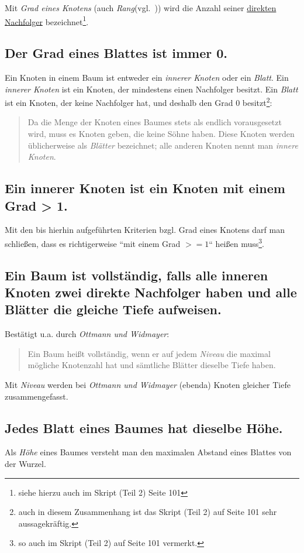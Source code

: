 Mit \textit{Grad eines Knotens} (auch \textit{Rang}(vgl.~\cite[260]{OW17e})) wird die Anzahl seiner \underline{direkten Nachfolger} bezeichnet\footnote{siehe hierzu auch im Skript (Teil 2) Seite 101}.

\subsection*{Der Grad eines Blattes ist immer 0.}

Ein Knoten in einem Baum ist entweder ein \textit{innerer Knoten} oder ein \textit{Blatt}.
Ein \textit{innerer Knoten} ist ein Knoten, der mindestens einen Nachfolger besitzt.
Ein \textit{Blatt} ist ein Knoten, der keine Nachfolger hat, und deshalb den Grad $0$ besitzt\footnote{
auch in diesem Zusammenhang ist das Skript (Teil 2) auf Seite 101 sehr aussagekräftig.
}:

\blockquote[{\cite[259, Hervorhebungen i.O.]{OW17e}}]{
    Da die Menge der Knoten eines Baumes stets als endlich vorausgesetzt wird, muss es
    Knoten geben, die keine Söhne haben. Diese Knoten werden üblicherweise als \textit{Blätter}
    bezeichnet; alle anderen Knoten nennt man \textit{innere Knoten}.
}

\subsection*{Ein innerer Knoten ist ein Knoten mit einem Grad > 1.}
Mit den bis hierhin aufgeführten Kriterien {bzgl.} Grad eines Knotens darf man schließen, dass es richtigerweise ``mit einem Grad $>= 1$`` heißen muss\footnote{
    so auch im Skript (Teil 2) auf Seite 101 vermerkt.
}.


\subsection*{Ein Baum ist vollständig, falls alle inneren Knoten zwei direkte Nachfolger haben und alle Blätter die gleiche Tiefe aufweisen.}

Bestätigt u.a. durch \textit{Ottmann und Widmayer}:

\blockquote[{\cite[261, Hervorhebungen i.O.]{OW17e}}]{
    Ein Baum heißt vollständig, wenn er auf jedem \textit{Niveau} die maximal mögliche Knotenzahl hat und sämtliche Blätter dieselbe Tiefe haben.
}

Mit \textit{Niveau} werden bei \textit{Ottmann und Widmayer} (ebenda) Knoten gleicher Tiefe zusammengefasst.


\subsection*{Jedes Blatt eines Baumes hat dieselbe Höhe.}
Als \textit{Höhe} eines Baumes versteht man den maximalen Abstand eines Blattes von der Wurzel.

